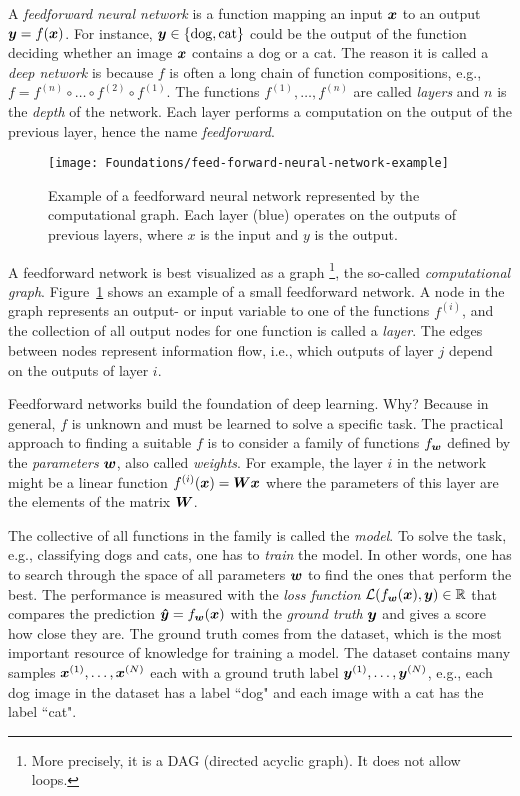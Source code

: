 		A \emph{feedforward neural network} is a function mapping an input $\bm{x}$ to an output $\bm{y} = f(\bm{x})$.
		For instance, $\bm{y} \in \{\text{dog}, \text{cat} \}$ could be the output of the function deciding whether an image $\bm{x}$ contains a dog or a cat. 
		The reason it is called a \emph{deep network} is because $f$ is often a long chain of function compositions, e.g., 
		$f = f^{(n)} \circ  \ldots  \circ f^{(2)} \circ f^{(1)}$.
		The functions $f^{(1)}, \dots, f^{(n)}$ are called \emph{layers} and $n$ is the \emph{depth} of the network.
		Each layer performs a computation on the output of the previous layer, hence the name \emph{feedforward}.
		\begin{figure}[t]
			\centering
			\texttt{[image: Foundations/feed-forward-neural-network-example]}
			\caption[Example of a feedforward neural network]
					{Example of a feedforward neural network represented by the computational graph. 
					 Each layer (blue) operates on the outputs of previous layers, where $x$ is the input and $y$ is the output.
					 \label{fig:example_feed_forward_network}}
		\end{figure}
		A feedforward network is best visualized as a graph%
		\footnote{More precisely, it is a DAG (directed acyclic graph). It does not allow loops.}, 
		the so-called \emph{computational graph}.
		Figure~\ref{fig:example_feed_forward_network} shows an example of a small feedforward network.
		A node in the graph represents an output- or input variable to one of the functions $f^{(i)}$, and the collection of all output nodes for one function is called a \emph{layer}. 
		The edges between nodes represent information flow, i.e., which outputs of layer $j$ depend on the outputs of layer $i$.
		
		Feedforward networks build the foundation of deep learning.
		Why?
		Because in general, $f$ is unknown and must be learned to solve a specific task.
		The practical approach to finding a suitable $f$ is to consider a family of functions $f_{\bm{w}}$ defined by the \emph{parameters} $\bm{w}$, also called \emph{weights}.
		For example, the layer $i$ in the network might be a linear function $f_{}^{(i)}(\bm{x}) = \bm{W} \bm{x}$ where the parameters of this layer are the elements of the matrix $\bm{W}$.
		
		The collective of all functions in the family is called the \emph{model}.
		To solve the task, e.g., classifying dogs and cats, one has to \emph{train} the model.
		In other words, one has to search through the space of all parameters $\bm{w}$ to find the ones that perform the best.
		The performance is measured with the \emph{loss function} 
		$\mathcal{L}(f_{\bm{w}}(\bm{x}), \bm{y}) \in \mathbb{R}$ that compares the prediction 
		$\bm{\hat{y}} = f_{\bm{w}}(\bm{x})$ with the \emph{ground truth} $\bm{y}$ and gives a score how close they are.
		The ground truth comes from the dataset, which is the most important resource of knowledge for training a model.
		The dataset contains many samples $\bm{x}^{(1)}, \dots, \bm{x}^{(N)}$ each with a ground truth label 
		$\bm{y}^{(1)}, \dots, \bm{y}^{(N)}$, e.g., each dog image in the dataset has a label ``dog" and each image with a cat has the label ``cat".
		
